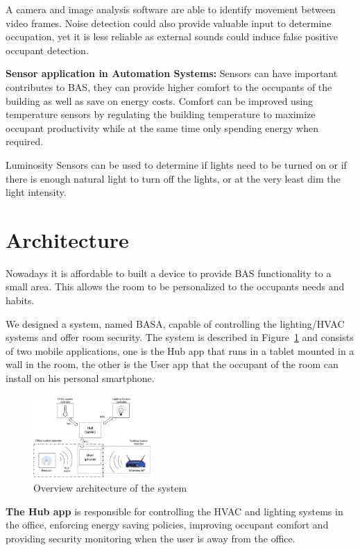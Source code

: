 \documentclass[conference]{IEEEtran}
\begin{document}
A camera and image analysis software are able to identify movement between video frames. Noise detection could also provide valuable input to determine occupation, yet it is less reliable as external sounds could induce false positive occupant detection.

 


\textbf{Sensor application in Automation Systems:}
Sensors can have important contributes to \ac{BAS}, they can provide higher comfort to the occupants of the building as well as save on energy costs. Comfort can be improved using temperature sensors by regulating the building temperature to maximize occupant productivity while at the same time only spending energy when required. 

Luminosity Sensors can be used to determine if lights need to be turned on or if there is enough natural light to turn off the lights, or at the very least dim the light intensity.



\section{Architecture}
\label{act}

Nowadays it is affordable to built a device to provide \ac{BAS} functionality to a small area. This allows the room to be personalized to the occupants needs and habits.

We designed a system, named BASA, capable of controlling the lighting/\ac{HVAC} systems and offer room security. The system is described in Figure~\ref{software1} and consists of two mobile applications, one is the Hub app that runs in a tablet mounted in a wall in the room, the other is the User app that the occupant of the room can install on his personal smartphone. 


\begin{figure}[h]
\centering
\includegraphics[width=0.4\textwidth]{Figures/harware_arch}
\caption{Overview architecture of the system}
\label{software1}
\end{figure}

\textbf{The Hub app} is responsible for controlling the \ac{HVAC} and lighting systems in the office, enforcing energy saving policies, improving occupant comfort and providing security monitoring when the user is away from the office.
\end{document}
